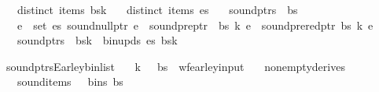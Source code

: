 \begin{isabellebody}
\ \ \ {\isachardoublequoteopen}distinct\ {\isacharparenleft}{\kern0pt}items\ {\isacharparenleft}{\kern0pt}bs{\isacharbang}{\kern0pt}k{\isacharparenright}{\kern0pt}{\isacharparenright}{\kern0pt}{\isachardoublequoteclose}\isanewline
\ \ \ {\isachardoublequoteopen}distinct\ {\isacharparenleft}{\kern0pt}items\ es{\isacharparenright}{\kern0pt}{\isachardoublequoteclose}\isanewline
\ \ \ {\isachardoublequoteopen}sound{\isacharunderscore}{\kern0pt}ptrs\ {\isasymomega}\ bs{\isachardoublequoteclose}\isanewline
\ \ \ {\isachardoublequoteopen}{\isasymforall}e\ {\isasymin}\ set\ es{\isachardot}{\kern0pt}\ sound{\isacharunderscore}{\kern0pt}null{\isacharunderscore}{\kern0pt}ptr\ e\ {\isasymand}\ sound{\isacharunderscore}{\kern0pt}pre{\isacharunderscore}{\kern0pt}ptr\ {\isasymomega}\ bs\ k\ e\ {\isasymand}\ sound{\isacharunderscore}{\kern0pt}prered{\isacharunderscore}{\kern0pt}ptr\ bs\ k\ e{\isachardoublequoteclose}\isanewline
\ \ \ {\isachardoublequoteopen}sound{\isacharunderscore}{\kern0pt}ptrs\ {\isasymomega}\ {\isacharparenleft}{\kern0pt}bs{\isacharbrackleft}{\kern0pt}k\ {\isacharcolon}{\kern0pt}{\isacharequal}{\kern0pt}\ bin{\isacharunderscore}{\kern0pt}upds\ es\ {\isacharparenleft}{\kern0pt}bs{\isacharbang}{\kern0pt}k{\isacharparenright}{\kern0pt}{\isacharbrackright}{\kern0pt}{\isacharparenright}{\kern0pt}{\isachardoublequoteclose}%
\isadelimproof
%
\endisadelimproof
%
\isatagproof
%
\endisatagproof
{\isafoldproof}%
%
\isadelimproof
%
\endisadelimproof
%
\begin{isamarkuptext}%
%
\end{isamarkuptext}\isamarkuptrue%
\isamarkupfalse%
\ sound{\isacharunderscore}{\kern0pt}ptrs{\isacharunderscore}{\kern0pt}Earley{\isacharunderscore}{\kern0pt}bin{\isacharunderscore}{\kern0pt}list{\isacharprime}{\kern0pt}{\isacharcolon}{\kern0pt}\isanewline
\ \ \ {\isachardoublequoteopen}{\isacharparenleft}{\kern0pt}k{\isacharcomma}{\kern0pt}\ {\isasymG}{\isacharcomma}{\kern0pt}\ {\isasymomega}{\isacharcomma}{\kern0pt}\ bs{\isacharparenright}{\kern0pt}\ {\isasymin}\ wf{\isacharunderscore}{\kern0pt}earley{\isacharunderscore}{\kern0pt}input{\isachardoublequoteclose}\isanewline
\ \ \ {\isachardoublequoteopen}nonempty{\isacharunderscore}{\kern0pt}derives\ {\isasymG}{\isachardoublequoteclose}\isanewline
\ \ \ {\isachardoublequoteopen}sound{\isacharunderscore}{\kern0pt}items\ {\isasymG}\ {\isasymomega}\ {\isacharparenleft}{\kern0pt}bins\ bs{\isacharparenright}{\kern0pt}{\isachardoublequoteclose}\isanewline

\end{isabellebody}

